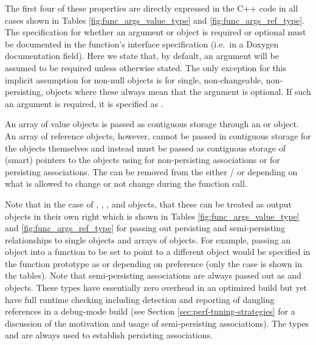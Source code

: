 \documentclass[pdf,ps2pdf,11pt]{SANDreport}
\begin{document}
The first four of these properties are directly expressed in the C++
code in all cases shown in Tables {}\ref{fig:func_args_value_type} and
{}\ref{fig:func_args_ref_type}.  The specification for whether an
argument or object is required or optional must be documented in the
function's interface specification (i.e.\ in a Doxygen documentation
{} field).  Here we state that, by default, an argument
will be assumed to be required unless otherwise stated.  The only
exception for this implicit assumption for non-null objects is
{} for single, non-changeable,
non-persisting, objects where these always mean that the argument is
optional.  If such an argument is required, it is specified as
{}.

An array of value objects is passed as contiguous storage through an
{} or {} object.  An
array of reference objects, however, cannot be passed in contiguous
storage for the objects themselves and instead must be passed as
contiguous storage of (smart) pointers to the objects using
{} for non-persisting
associations or {} for
persisting associations.  The {} can be removed from the
either {}/{} or {} depending on what
is allowed to change or not change during the function call.

Note that in the case of {}, {}, {},
and {} objects, that these can be treated as output
objects in their own right which is shown in Tables
{}\ref{fig:func_args_value_type} and {}\ref{fig:func_args_ref_type}
for passing out persisting and semi-persisting relationships to single
objects and arrays of objects.  For example, passing an {}
object into a function to be set to point to a different {}
object would be specified in the function prototype as {} or {} depending on preference (only the
case {} is shown in the tables).  Note that
semi-persisting associations are always passed out as {} and
{} objects.  These types have essentially zero overhead
in an optimized build but yet have full runtime checking including
detection and reporting of dangling references in a debug-mode build
(see Section {}\ref{sec:perf-tuning-strategies} for a discussion of
the motivation and usage of semi-persisting associations).  The types
{} and {} are always used to establish
persisting associations.
\end{document}
